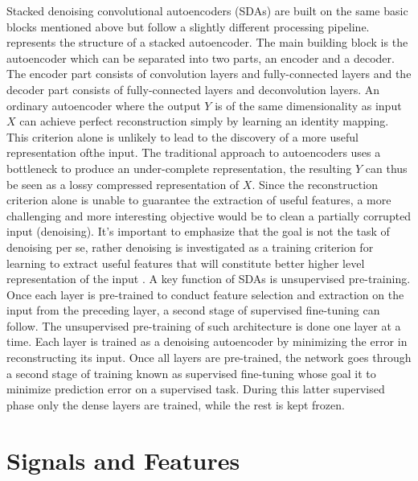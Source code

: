 Stacked denoising convolutional autoencoders (SDAs) are built on the same basic blocks mentioned above but follow a slightly different processing pipeline.  represents the structure of a stacked autoencoder. The main building block is the autoencoder which can be separated into two parts, an encoder and a decoder. The encoder part consists of convolution layers and \mbox{fully-connected} layers and the decoder part consists of \mbox{fully-connected} layers and deconvolution layers. An ordinary autoencoder where the output $Y$ is of the same dimensionality as input $X$ can achieve perfect reconstruction simply by learning an identity mapping. This criterion alone is unlikely to lead to the discovery of a more useful representation ofthe input. The traditional approach to autoencoders uses a bottleneck to produce an \mbox{under-complete} representation, the resulting $Y$ can thus be seen as a lossy compressed representation of $X$. Since the reconstruction criterion alone is unable to guarantee the extraction of useful features, a more challenging and more interesting objective would be to clean a partially corrupted input (denoising). It's important to emphasize that the goal is not the task of denoising per se, rather denoising is investigated as a training criterion for learning to extract useful features that will constitute better higher level representation of the input \cite{Pascal-2010}. A key function of SDAs is unsupervised \mbox{pre-training}. Once each layer is \mbox{pre-trained} to conduct feature selection and extraction on the input from the preceding layer, a second stage of supervised \mbox{fine-tuning} can follow. The unsupervised \mbox{pre-training} of such architecture is done one layer at a time. Each layer is trained as a denoising autoencoder by minimizing the error in reconstructing its input. Once all layers are \mbox{pre-trained}, the network goes through a second stage of training known as supervised \mbox{fine-tuning} whose goal it to minimize prediction error on a supervised task. During this latter supervised phase only the dense layers are trained, while the rest is kept frozen.






\section{Signals and Features}
\label{sec:signals_features}


